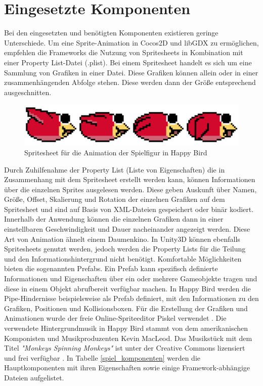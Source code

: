 \section{Eingesetzte Komponenten}
\label{sec:eingesetze_komponenten}
Bei den eingesetzten und benötigten Komponenten existieren geringe Unterschiede. Um eine Sprite-Animation in Cocos2D und libGDX zu ermöglichen, empfehlen die Frameworks die Nutzung von Spritesheets in Kombination mit einer Property List-Datei (.plist). Bei einem Spritesheet handelt es sich um eine Sammlung von Grafiken in einer Datei. Diese Grafiken können allein oder in einer zusammenhängenden Abfolge stehen. Diese werden dann der Größe entsprechend ausgeschnitten.

\begin{figure}[htbp]
	\centering
	\includegraphics[width=1.0\textwidth]{bilder/Red_Bird}
	\caption{Spritesheet für die Animation der Spielfigur in Happy Bird}\label{spritesheet}
\end{figure}

Durch Zuhilfenahme der Property List (Liste von Eigenschaften) die in Zusammenhang mit dem Spritesheet erstellt werden kann, können Informationen über die einzelnen Sprites ausgelesen werden. Diese geben Auskunft über Namen, Größe, Offset, Skalierung und Rotation der einzelnen Grafiken auf dem Spritesheet und sind auf Basis von XML-Dateien gespeichert oder binär kodiert. Innerhalb der Anwendung können die einzelnen Grafiken dann in einer einstellbaren Geschwindigkeit und Dauer nacheinander angezeigt werden. Diese Art von Animation ähnelt einem Daumenkino.
In Unity3D können ebenfalls Spritesheets genutzt werden, jedoch werden die Property Lists für die Teilung und den Informationshintergrund nicht benötigt. Komfortable Möglichkeiten bieten die sogenannten Prefabs. Ein Prefab kann spezifisch definierte Informationen und Eigenschaften über ein oder mehrere Gameobjekte tragen und diese in einem Objekt abrufbereit verfügbar machen. In Happy Bird werden die Pipe-Hindernisse beispielsweise als Prefab definiert, mit den Informationen zu den Grafiken, Positionen und Kollisionsboxen.
Für die Erstellung der Grafiken und Animationen wurde der freie Online-Spriteeditor Piskel verwendet \citep{piskel}. 
Die verwendete Hintergrundmusik in Happy Bird stammt von dem amerikanischen Komponisten und Musikproduzenten Kevin MacLeod. Das Musikstück mit dem Titel \emph{"Monkeys Spinning Monkeys"} ist unter der Creative Commons lizensiert und frei verfügbar \citep{macLeod}. 
In Tabelle \ref{spiel_komponenten} werden die Hauptkomponenten mit ihren Eigenschaften sowie einige Framework-abhängige Dateien aufgelistet.

